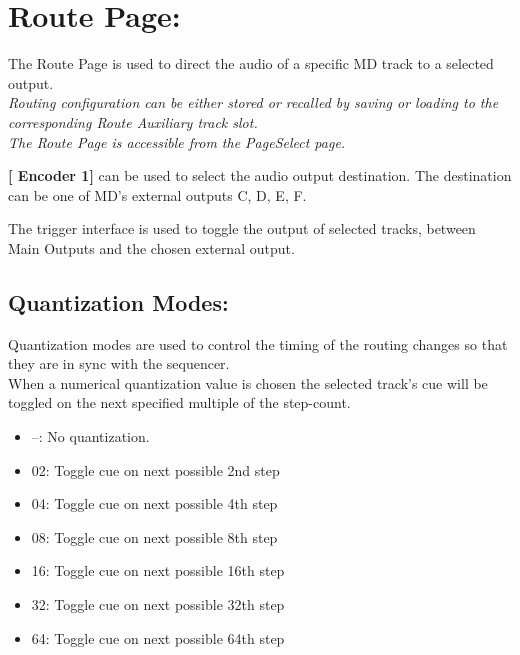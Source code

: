  \chapter{Route Page:}
 The Route Page is used to direct the audio of a specific MD track to a selected output.\\\textit{Routing configuration can be either stored or recalled by saving or loading to the corresponding Route Auxiliary track slot.} \\
 
\textit{The Route Page is accessible from the PageSelect page.}



\textbf{[ Encoder 1]} can be used to select the audio output destination. The destination can be one of MD's external outputs C, D, E, F.

The trigger interface is used to toggle the output of selected tracks, between Main Outputs and the chosen external output.

\newpage
\section{Quantization Modes:}
 Quantization modes are used to control the timing of the routing changes so that they are in sync with the sequencer.
 \\
 When a numerical quantization value is chosen the selected track’s cue will be toggled on the next specified multiple of the step-count.
 \begin{itemize}
\item --: No quantization.
\item 02: Toggle cue on next possible 2nd step
\item 04: Toggle cue on next possible 4th step
\item 08: Toggle cue on next possible 8th step 
\item 16: Toggle cue on next possible 16th step 
\item 32: Toggle cue on next possible 32th step 
\item 64: Toggle cue on next possible 64th step
 \end{itemize}
 
 